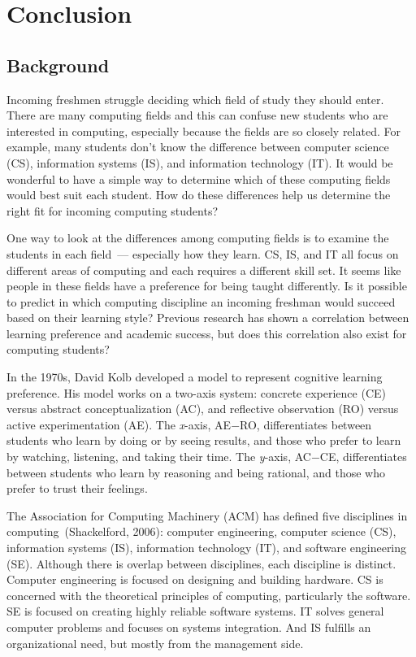 \chapter{Conclusion}\label{chp:chapter5}
\section{Background}
Incoming freshmen struggle deciding which field of study they should enter. There are many computing fields and this can confuse new students who are interested in computing, especially because the fields are so closely related. For example, many students don't know the difference between computer science (CS), information systems (IS), and information technology (IT). It would be wonderful to have a simple way to determine which of these computing fields would best suit each student. How do these differences help us determine the right fit for incoming computing students?

One way to look at the differences among computing fields is to examine the students in each field~--- especially how they learn. CS, IS, and IT all focus on different areas of computing and each requires a different skill set. It seems like people in these fields have a preference for being taught differently. Is it possible to predict in which computing discipline an incoming freshman would succeed based on their learning style? Previous research has shown a correlation between learning preference and academic success, but does this correlation also exist for computing students?

In the 1970s, David Kolb developed a model to represent cognitive learning preference. His model works on a two-axis system: concrete experience (CE) versus abstract conceptualization (AC), and reflective observation (RO) versus active experimentation (AE). The \textit{x}-axis, AE$-$RO, differentiates between students who learn by doing or by seeing results, and those who prefer to learn by watching, listening, and taking their time. The \textit{y}-axis, AC$-$CE, differentiates between students who learn by reasoning and being rational, and those who prefer to trust their feelings.

The Association for Computing Machinery (ACM) has defined five disciplines in computing~(Shackelford, 2006): computer engineering, computer science (CS), information systems (IS), information technology (IT), and software engineering (SE). Although there is overlap between disciplines, each discipline is distinct. Computer engineering is focused on designing and building hardware. CS is concerned with the theoretical principles of computing, particularly the software. SE is focused on creating highly reliable software systems. IT solves general computer problems and focuses on systems integration. And IS fulfills an organizational need, but mostly from the management side.

